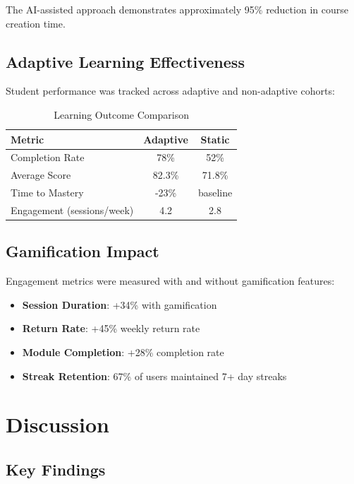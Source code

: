 \documentclass[conference]{IEEEtran}
\begin{document}
The AI-assisted approach demonstrates approximately 95\% reduction in course creation time.

\subsection{Adaptive Learning Effectiveness}

Student performance was tracked across adaptive and non-adaptive cohorts:

\begin{table}[htbp]
\caption{Learning Outcome Comparison}
\begin{center}
\begin{tabular}{|l|c|c|}
\hline
\textbf{Metric} & \textbf{Adaptive} & \textbf{Static} \\
\hline
Completion Rate & 78\% & 52\% \\
Average Score & 82.3\% & 71.8\% \\
Time to Mastery & -23\% & baseline \\
Engagement (sessions/week) & 4.2 & 2.8 \\
\hline
\end{tabular}
\label{tab:adaptive}
\end{center}
\end{table}

\subsection{Gamification Impact}

Engagement metrics were measured with and without gamification features:

\begin{itemize}
    \item \textbf{Session Duration}: +34\% with gamification
    \item \textbf{Return Rate}: +45\% weekly return rate
    \item \textbf{Module Completion}: +28\% completion rate
    \item \textbf{Streak Retention}: 67\% of users maintained 7+ day streaks
\end{itemize}

\section{Discussion}

\subsection{Key Findings}
\end{document}
